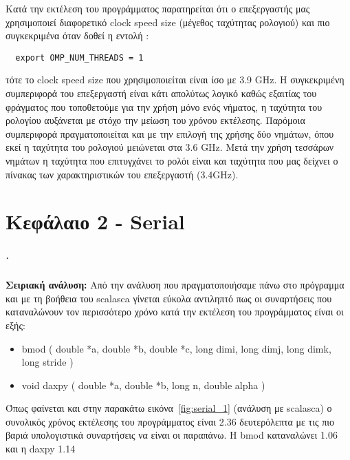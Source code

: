 \documentclass[greek,booktabs,8pt,flagBlueCMYK]{report}
\begin{document}
Κατά την εκτέλεση του προγράμματος παρατηρείται ότι ο επεξεργαστής μας χρησιμοποιεί διαφορετικό clock speed size (μέγεθος ταχύτητας ρολογιού) και πιο συγκεκριμένα όταν δοθεί η εντολή :
\begin{lstlisting}
  export OMP_NUM_THREADS = 1
\end{lstlisting}
τότε το clock speed size που χρησιμοποιείται είναι ίσο με 3.9 GHz. Η συγκεκριμένη συμπεριφορά του επεξεργαστή είναι κάτι απολύτως λογικό καθώς εξαιτίας του φράγματος που τοποθετούμε για την χρήση μόνο ενός νήματος, η ταχύτητα του ρολογίου αυξάνεται με στόχο την μείωση του χρόνου εκτέλεσης. 
\FloatBarrier
Παρόμοια συμπεριφορά πραγματοποιείται και με την επιλογή της χρήσης δύο νημάτων, όπου εκεί η ταχύτητα του ρολογιού μειώνεται στα 3.6 GHz. 
\FloatBarrier
Μετά την χρήση τεσσάρων νημάτων η ταχύτητα που επιτυγχάνει το ρολόι είναι και ταχύτητα που μας δείχνει ο πίνακας των χαρακτηριστικών του επεξεργαστή (3.4GHz).


\clearpage
\chapter{Κεφάλαιο 2 - Serial}
\paragraph{.} \textbf{Σειριακή ανάλυση:}\newline
Από την ανάλυση που πραγματοποιήσαμε πάνω στο πρόγραμμα και με τη βοήθεια του scalasca γίνεται εύκολα αντιληπτό πως οι συναρτήσεις που καταναλώνουν τον περισσότερο χρόνο κατά την εκτέλεση του προγράμματος είναι οι εξής:
\begin{itemize}
  \item bmod ( double *a, double *b, double *c, long dimi, long dimj, long dimk, long stride )
  \item void daxpy ( double *a, double *b, long n, double alpha )
\end{itemize}
Όπως φαίνεται και στην παρακάτω εικόνα~\ref{fig:serial_1} (ανάλυση με scalasca) ο συνολικός χρόνος εκτέλεσης του προγράμματος είναι 2.36 δευτερόλεπτα με τις πιο βαριά υπολογιστικά συναρτήσεις να είναι οι παραπάνω. 
\FloatBarrier 
Η bmod καταναλώνει 1.06 και η daxpy  1.14
\end{document}
